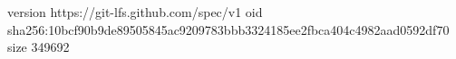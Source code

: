 version https://git-lfs.github.com/spec/v1
oid sha256:10bcf90b9de89505845ac9209783bbb3324185ee2fbca404c4982aad0592df70
size 349692
